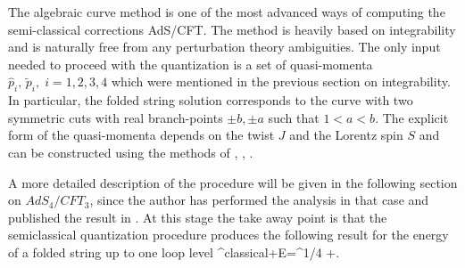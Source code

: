 The algebraic curve method is one of the most advanced ways of computing the semi-classical corrections AdS/CFT. The method is heavily based on integrability and is naturally free from any perturbation theory ambiguities. The only input needed to proceed with the quantization is a set of quasi-momenta $\hat p_i,\, \tilde p_i,\;i=1,2,3,4$ which were mentioned in the previous section on integrability. In particular, the folded string solution corresponds to the curve with two symmetric cuts with real branch-points $\pm b, \pm a$ such that $1<a<b$. The explicit form of the quasi-momenta depends on the twist $J$ and the Lorentz spin $S$ and can be constructed using the methods of \cite{Beisert:2003ea}, \cite{Kazakov:2004qf}, \cite{Kazakov:2004nh}. 
  
A more detailed description of the procedure will be given in the following section on $AdS_4/CFT_3$, since the author has performed the analysis in that case and published the result in \cite{Beccaria:2012qd} \cite{Beccaria:2012vb}. At this stage the take away point is that the semiclassical quantization procedure produces the following result for the energy of a folded string up to one loop level
 \beq \Delta^{\rm classical}+\delta E=\lambda^{1/4}
 +\;.  \eeq

